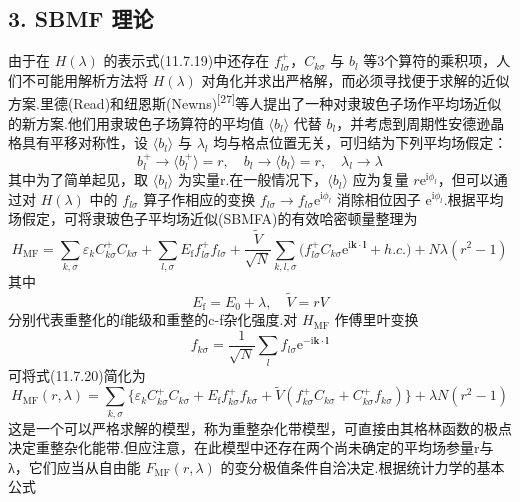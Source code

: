 \subsection*{3. SBMF 理论}

由于在 $H(\lambda)$ 的表示式(11.7.19)中还存在 $f_{l\sigma}^{+}$，$C_{k\sigma}$ 与 $b_{l}$ 等3个算符的乘积项，人们不可能用解析方法将 $H(\lambda)$ 对角化并求出严格解，而必须寻找便于求解的近似方案.里德(Read)和纽恩斯(Newns)\textsuperscript{[27]}等人提出了一种对隶玻色子场作平均场近似的新方案.他们用隶玻色子场算符的平均值 $\langle b_{l}\rangle$ 代替 $b_{l}$，并考虑到周期性安德逊晶格具有平移对称性，设 $\langle b_{l}\rangle$ 与 $\lambda_{l}$ 均与格点位置无关，可归结为下列平均场假定：
\begin{equation*}
  b_{l}^{+}\to\langle b_{l}^{+}\rangle=r,\quad
  b_{l}\to\langle b_{l}\rangle=r,\quad
  \lambda_{l}\to\lambda
\end{equation*}
其中为了简单起见，取 $\langle b_{l}\rangle$ 为实量r.在一般情况下，$\langle b_{l}\rangle$ 应为复量 $r\mathrm{e}^{\mathrm{i}\phi_{l}}$，但可以通过对 $H(\lambda)$ 中的 $f_{l\sigma}$ 算子作相应的变换 $f_{l\sigma}\to f_{l\sigma}\mathrm{e}^{\mathrm{i}\phi_{l}}$ 消除相位因子 $\mathrm{e}^{\mathrm{i}\phi_{l}}$.根据平均场假定，可将隶玻色子平均场近似(SBMFA)的有效哈密顿量整理为
\begin{equation}
  H_{\mathrm{MF}}=\sum_{k,\sigma}\varepsilon_{k}C_{k\sigma}^{+}C_{k\sigma}
  +\sum_{l,\sigma}E_{\mathrm{f}}f_{l\sigma}^{+}f_{l\sigma}
  +\frac{\widetilde{V}}{\sqrt{N}}\sum_{k,l,\sigma}\bigl(f_{l\sigma}^{+}C_{k\sigma}\mathrm{e}^{\mathrm{i}\boldsymbol{k}\cdot\boldsymbol{l}}+h.c.\bigr)
  +N\lambda(r^{2}-1)
\end{equation}
其中
\begin{equation}
  E_{\mathrm{f}}=E_{0}+\lambda,\quad\widetilde{V}=rV
\end{equation}
分别代表重整化的f能级和重整的c-f杂化强度.对 $H_{\mathrm{MF}}$ 作傅里叶变换
\begin{equation*}
  f_{k\sigma}=\frac{1}{\sqrt{N}}\sum_{l}f_{l\sigma}\mathrm{e}^{-\mathrm{i}\boldsymbol{k}\cdot\boldsymbol{l}}
\end{equation*}
可将式(11.7.20)简化为
\begin{equation}
  H_{\mathrm{MF}}(r,\lambda)=\sum_{k,\sigma}\bigl\{\varepsilon_{k}C_{k\sigma}^{+}C_{k\sigma}
  +E_{\mathrm{f}}f_{k\sigma}^{+}f_{k\sigma}
  +\widetilde{V}(f_{k\sigma}^{+}C_{k\sigma}+C_{k\sigma}^{+}f_{k\sigma})\bigr\}
  +\lambda N(r^{2}-1)
\end{equation}
这是一个可以严格求解的模型，称为重整杂化带模型，可直接由其格林函数的极点决定重整杂化能带.但应注意，在此模型中还存在两个尚未确定的平均场参量r与λ，它们应当从自由能 $F_{\mathrm{MF}}(r,\lambda)$ 的变分极值条件自洽决定.根据统计力学的基本公式
